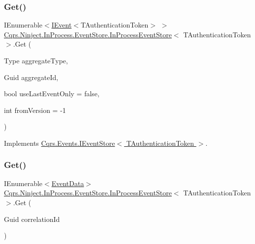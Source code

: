\subsubsection{\texorpdfstring{Get()}{Get()}\hspace{0.1cm}{\footnotesize\ttfamily [1/2]}}
{\footnotesize\ttfamily I\+Enumerable$<$\hyperlink{interfaceCqrs_1_1Events_1_1IEvent}{I\+Event}$<$T\+Authentication\+Token$>$ $>$ \hyperlink{classCqrs_1_1Ninject_1_1InProcess_1_1EventStore_1_1InProcessEventStore}{Cqrs.\+Ninject.\+In\+Process.\+Event\+Store.\+In\+Process\+Event\+Store}$<$ T\+Authentication\+Token $>$.Get (\begin{DoxyParamCaption}\item[{Type}]{aggregate\+Type,  }\item[{Guid}]{aggregate\+Id,  }\item[{bool}]{use\+Last\+Event\+Only = {\ttfamily false},  }\item[{int}]{from\+Version = {\ttfamily -\/1} }\end{DoxyParamCaption})}



Implements \hyperlink{interfaceCqrs_1_1Events_1_1IEventStore_ae02ef6c804d0c4a92705a447bc4b2214}{Cqrs.\+Events.\+I\+Event\+Store$<$ T\+Authentication\+Token $>$}.

\mbox{\label{classCqrs_1_1Ninject_1_1InProcess_1_1EventStore_1_1InProcessEventStore_ae07e89f6a8ca48d7d7f25d8a52703fbd}} 
\subsubsection{\texorpdfstring{Get()}{Get()}\hspace{0.1cm}{\footnotesize\ttfamily [2/2]}}
{\footnotesize\ttfamily I\+Enumerable$<$\hyperlink{classCqrs_1_1Events_1_1EventData}{Event\+Data}$>$ \hyperlink{classCqrs_1_1Ninject_1_1InProcess_1_1EventStore_1_1InProcessEventStore}{Cqrs.\+Ninject.\+In\+Process.\+Event\+Store.\+In\+Process\+Event\+Store}$<$ T\+Authentication\+Token $>$.Get (\begin{DoxyParamCaption}\item[{Guid}]{correlation\+Id }\end{DoxyParamCaption})}



